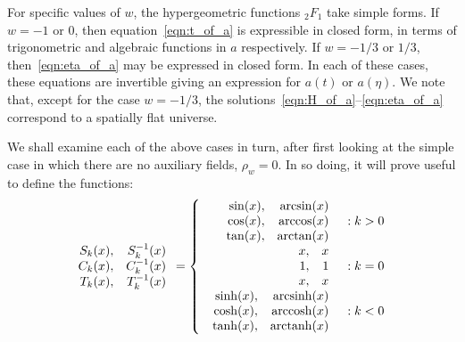 For specific values of $w$, the hypergeometric functions $_2F_1$ take simple forms. If $w=-1$ or $0$, then equation~\eqref{eqn:t_of_a} is expressible in closed form, in terms of trigonometric and algebraic functions in $a$ respectively. If $w=-1/3$ or $1/3$, then~\eqref{eqn:eta_of_a} may be expressed in closed form. In each of these cases, these equations are invertible giving an expression for $a(t)$ or $a(\eta)$.  We note that, except for the case $w=-1/3$, the solutions~\eqref{eqn:H_of_a}--\eqref{eqn:eta_of_a} correspond to a spatially flat universe.

We shall examine each of the above cases in turn, after first looking at the simple case in which there are no auxiliary fields, $\rho_w=0$.  In so doing, it will prove useful to define the functions:
%
\begin{equation}
  \begin{array}{rr}
    S_k(x),&S_k^{-1}(x)
    \\ 
    C_k(x),&C_k^{-1}(x)
    \\ 
    T_k(x),&T_k^{-1}(x)
    \\
  \end{array}
  =
  \left\{
%
  \begin{array}{rl}
%
    \begin{array}{rr}
      \sin(x),&\arcsin(x)
      \\ 
      \cos(x),&\arccos(x)
      \\ 
      \tan(x),&\arctan(x)
      \\
    \end{array}
%
    &: k>0 \\
%
    \begin{array}{rr}
      x,&x
      \\ 
      1,&1
      \\ 
      x,&x
      \\
    \end{array}
%
    &: k=0 \\
%
    \begin{array}{rr}
      \sinh(x),&\arcsinh(x)
      \\ 
      \cosh(x),&\arccosh(x)
      \\ 
      \tanh(x),&\arctanh(x)
      \\
    \end{array}
%
    &: k<0
  \end{array}
%
  \right. 
\end{equation}
%

